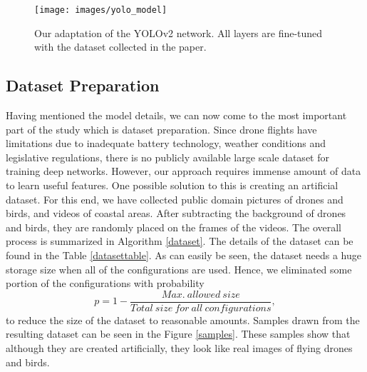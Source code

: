 \documentclass[10pt,twocolumn,letterpaper]{article}
\begin{document}
\begin{figure*}[t]
	\texttt{[image: images/yolo\_model]}
    \caption{Our adaptation of the YOLOv2 network. All layers are fine-tuned with the dataset collected in the paper.}
    \label{yolomodel}
\end{figure*}\subsection{Dataset Preparation}
Having mentioned the model details,  we can now come to the most important part of the study which is dataset preparation. Since drone flights have limitations due to inadequate battery technology, weather conditions and legislative regulations, there is no publicly available large scale dataset for training deep networks. However, our approach requires immense amount of data to learn useful features. One possible solution to this is creating an artificial dataset. For this end, we have collected public domain pictures of drones and birds, and videos of coastal areas. After subtracting the background of drones and birds, they are randomly placed on the frames of the videos. The overall process is summarized in Algorithm \ref{dataset}. The details of the dataset can be found in the Table \ref{datasettable}. As can easily be seen, the dataset needs a huge storage size when all of the configurations are used. Hence, we eliminated some portion of the configurations with probability 
\[p=1-\frac{Max.\:allowed\:size}{Total\:size\:for\:all\:configurations},\]
to reduce the size of the dataset to reasonable amounts. Samples drawn from the resulting dataset can be seen in the Figure \ref{samples}. These samples show that although they are created artificially, they look like real images of flying drones and birds.
\end{document}
